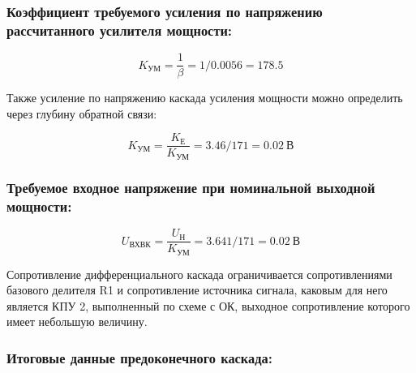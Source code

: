\subsubsection{	Коэффициент требуемого усиления по напряжению рассчитанного усилителя мощности:}

\begin{equation}
\label{eq:equation4_21}
K_{\text{УМ}}=\dfrac{1}{\beta}=1/0.0056=178.5
\end{equation}

Также усиление по напряжению каскада усиления мощности можно определить через глубину обратной связи:

\begin{equation}
\label{eq:equation4_22}
K_{\text{УМ}}=\dfrac {K_{\text{Е}}}{K_{\text{УМ}}}=3.46/171=0.02~\text{В}
\end{equation}

\subsubsection{Требуемое входное напряжение при номинальной выходной мощности:} %


\begin{equation}
\label{eq:equation4_22}
U_{\text{ВХВК}}=\dfrac{U_{\text{Н}}}{K_{\text{УМ}}}=3.641/171=0.02 ~\text{В}
\end{equation}

Сопротивление дифференциального каскада ограничивается сопротивлениями базового делителя R1 и сопротивление источника сигнала, каковым для него является КПУ 2, выполненный по схеме с ОК, выходное сопротивление которого имеет небольшую величину.
\subsubsection{	Итоговые данные предоконечного каскада:	}
